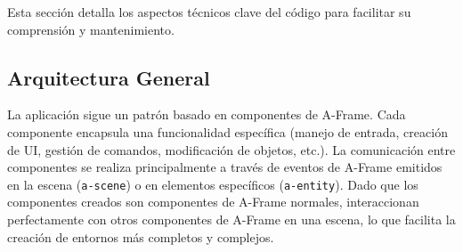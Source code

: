 \documentclass[a4paper, 12pt]{book}
\begin{document}
Esta sección detalla los aspectos técnicos clave del código para facilitar su comprensión y mantenimiento.

\subsection{Arquitectura General}

La aplicación sigue un patrón basado en componentes de A-Frame. Cada componente encapsula una funcionalidad específica (manejo de entrada, creación de UI, gestión de comandos, modificación de objetos, etc.). 
La comunicación entre componentes se realiza principalmente a través de eventos de A-Frame emitidos en la escena (\texttt{a-scene}) o en elementos específicos (\texttt{a-entity}).
Dado que los componentes creados son componentes de A-Frame normales, interaccionan perfectamente con otros componentes de A-Frame en una escena, lo que facilita la creación de entornos más completos y complejos.
\end{document}
